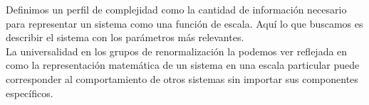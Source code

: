 \documentclass[12pt]{extreport}
\begin{document}
	Definimos un perfil de complejidad como la cantidad de información necesario para representar un sistema como una función de escala. Aquí lo que buscamos es describir el sistema con los parámetros más relevantes.\\
	
	La universalidad en los grupos de renormalización la podemos ver reflejada en como la representación matemática de un sistema en una escala particular puede corresponder al comportamiento de otros sistemas sin importar sus componentes específicos.
	
	
	
\end{document}
